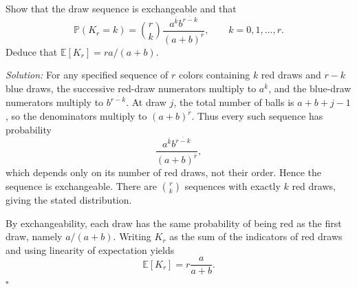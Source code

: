 \documentclass[a4paper,11pt,abstracton]{scrartcl}
\theoremstyle{dotlessP}
\theoremstyle{dotlessS}
\theoremstyle{remark}
\theoremstyle{definition}
\begin{document}
\begin{problem_box}
Show that the draw sequence is exchangeable and that
\[
  \mathbb{P}(K_r=k)
  =\binom{r}{k}
    \frac{a^{\overline{k}}b^{\overline{r-k}}}
         {(a+b)^{\overline{r}}},
  \qquad k=0,1,\ldots,r.
\]
Deduce that $\mathbb{E}[K_r]=ra/(a+b)$.
\end{problem_box}

\begin{claim_box}
\textit{Solution:} For any specified sequence of $r$ colors containing $k$ red draws and $r-k$ blue draws, the successive red-draw numerators multiply to $a^{\overline{k}}$, and the blue-draw numerators multiply to $b^{\overline{r-k}}$. At draw $j$, the total number of balls is $a+b+j-1$, so the denominators multiply to $(a+b)^{\overline{r}}$. Thus every such sequence has probability
\[
  \frac{a^{\overline{k}}b^{\overline{r-k}}}
       {(a+b)^{\overline{r}}},
\]
which depends only on its number of red draws, not their order. Hence the sequence is exchangeable. There are $\binom{r}{k}$ sequences with exactly $k$ red draws, giving the stated distribution.

By exchangeability, each draw has the same probability of being red as the first draw, namely $a/(a+b)$. Writing $K_r$ as the sum of the indicators of red draws and using linearity of expectation yields
\[
  \mathbb{E}[K_r]=r\frac{a}{a+b}.
\]
\hfill$\square$
\end{claim_box}
\end{document}
